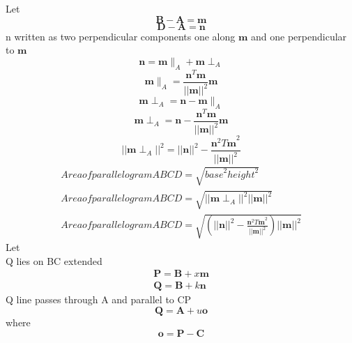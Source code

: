 \documentclass[journal,10pt,twocolumn]{article}
\begin{document}
Let 
\begin{equation}
\boldsymbol{B-A} = \boldsymbol{m}
\end{equation}
\begin{equation}
\boldsymbol{D-A} = \boldsymbol{n} 
\end{equation}
n written as two perpendicular components one along $\boldsymbol{m}$ and one perpendicular to $\boldsymbol{m}$
\begin{equation}
   \boldsymbol{n}=\boldsymbol{m} \parallel_A +\boldsymbol{m} \perp_A
\end{equation}
\begin{equation}
\boldsymbol{m} \parallel_A ={\frac{\boldsymbol{n}^T\boldsymbol{m}}{||\boldsymbol{m}||^2}}\boldsymbol{m}
\end{equation}
\begin{equation}
\boldsymbol{m} \perp_A =\boldsymbol{n} - \boldsymbol{m} \parallel_A
\end{equation}
\begin{equation}
\boldsymbol{m} \perp_A=\boldsymbol{n}-{\frac{\boldsymbol{n}^T\boldsymbol{m}}{||\boldsymbol{m}||^2}}\boldsymbol{m}
\end{equation}
\begin{equation}
||\boldsymbol{m} \perp_A||^2=||\boldsymbol{n}||^2-{\frac{{\boldsymbol{n}^2T\boldsymbol{m}}^2}{||\boldsymbol{m}||^2}}
\end{equation}
\begin{eqnarray}
    Area of parallelogram ABCD =\sqrt{{base}^2{height}^2}\\
    Area of parallelogram ABCD =\sqrt{{||\boldsymbol{m} \perp_A}||^2{||\boldsymbol{m}||^2}}\\
    Area of parallelogram ABCD =\sqrt{(||\boldsymbol{n}||^2-{\frac{{\boldsymbol{n}^2T\boldsymbol{m}}^2}{||\boldsymbol{m}||^2}})||\boldsymbol{m}||^2}
\end{eqnarray}
Let\\
Q lies on BC extended
\begin{eqnarray}
    \boldsymbol{P}=\boldsymbol{B}+x\boldsymbol{m}\\
    \boldsymbol{Q}=\boldsymbol{B}+k\boldsymbol{n}
\end{eqnarray}
Q line passes through A and parallel to CP
\begin{equation}
    \boldsymbol{Q}=\boldsymbol{A}+u\boldsymbol{o}
\end{equation}
where
\begin{equation}
	\boldsymbol{o}=\boldsymbol{P}-\boldsymbol{C}    
\end{equation}
\end{document}
